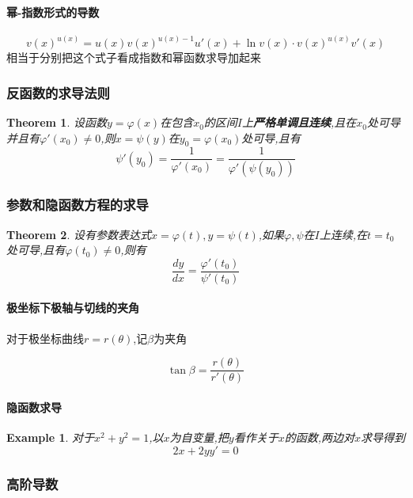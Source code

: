\documentclass[11pt,hyperref,a4paper,UTF8]{ctexart}
\newtheorem{theorem}{Theorem}[subsection]
\newtheorem{example}{Example}[subsection]
\begin{document}
\begin{CJK}{UTF8}{gkai}
\paragraph{幂-指数形式的导数}
\[v(x)^{u(x)} = u(x)v(x)^{u(x) - 1} u'(x)+ \ln v(x) \cdot v(x)^{u(x)}  v'(x) \]
相当于分别把这个式子看成指数和幂函数求导加起来

\subsubsection{反函数的求导法则}

\begin{theorem}
  设函数$y = \varphi(x)$在包含$x_0$的区间$I$上\textbf{严格单调且连续},且在$x_0$处可导并且有$\varphi'(x_0) \neq 0$,则$x = \psi(y)$在$y_0 = \varphi(x_0)$处可导,且有
  \[\psi'(y_0) = \dfrac{1}{\varphi'(x_0)} = \dfrac{1}{\varphi'(\psi(y_0))}\]
\end{theorem}

\subsubsection{参数和隐函数方程的求导}
\begin{theorem}
  设有参数表达式$x = \varphi(t),y = \psi(t)$,如果$\varphi,\psi$在$I$上连续,在$t = t_0$处可导,且有$\varphi(t_0) \neq 0$,则有
  \[\dfrac{dy}{dx} = \dfrac{\varphi'(t_0)}{\psi'(t_0)}\]
\end{theorem}

\paragraph{极坐标下极轴与切线的夹角\\}
对于极坐标曲线$r = r(\theta)$,$\text{记}\beta\text{为夹角}$

\[\tan \beta = \dfrac{r(\theta)}{r'(\theta)}\]

\paragraph{隐函数求导\\}

\begin{example}
  对于$x^2 + y^2 = 1$,以$x$为自变量,把$y$看作关于$x$的函数,两边对$x$求导得到
  \[2x + 2y y' = 0\]
\end{example}

\subsubsection{高阶导数}


\end{CJK}
\end{document}
